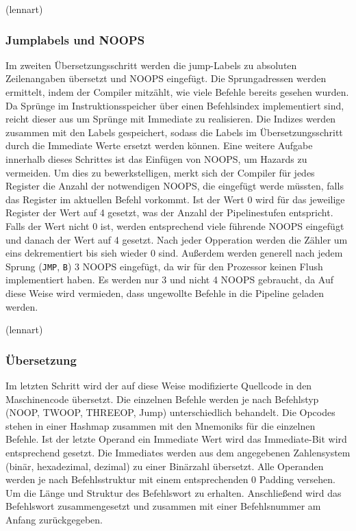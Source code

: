 \documentclass[paper=a4,fontsize=12pt,twocolumn]{scrreprt}
\begin{document}
(lennart)

\subsubsection{Jumplabels und NOOPS}
Im zweiten Übersetzungsschritt werden die jump-Labels zu absoluten Zeilenangaben übersetzt und NOOPS eingefügt.
Die Sprungadressen werden ermittelt, indem der Compiler mitzählt, wie viele Befehle bereits gesehen wurden.
Da Sprünge im Instruktionsspeicher über einen Befehlsindex implementiert sind, reicht dieser aus um Sprünge mit Immediate zu realisieren.
Die Indizes werden zusammen mit den Labels gespeichert, sodass die Labels im Übersetzungsschritt durch die Immediate Werte ersetzt werden können.
Eine weitere Aufgabe innerhalb dieses Schrittes ist das Einfügen von NOOPS, um Hazards zu vermeiden.
Um dies zu bewerkstelligen, merkt sich der Compiler für jedes Register die Anzahl der notwendigen NOOPS, die eingefügt werde müssten, falls das Register im aktuellen Befehl vorkommt.
Ist der Wert 0 wird für das jeweilige Register der Wert auf 4 gesetzt, was der Anzahl der Pipelinestufen entspricht.
Falls der Wert nicht 0 ist, werden entsprechend viele führende NOOPS eingefügt und danach der Wert auf 4 gesetzt. 
Nach jeder Opperation werden die Zähler um eins dekrementiert bis sieh wieder 0 sind.
Außerdem werden generell nach jedem Sprung (\texttt{JMP}, \texttt{B}) 3 NOOPS eingefügt, da wir für den Prozessor keinen Flush implementiert haben. Es werden nur 3 und nicht 4 NOOPS gebraucht, da 
Auf diese Weise wird vermieden, dass ungewollte Befehle in die Pipeline geladen werden.

(lennart)

\subsubsection{Übersetzung}
Im letzten Schritt wird der auf diese Weise modifizierte Quellcode in den Maschinencode übersetzt.
Die einzelnen Befehle werden je nach Befehlstyp (NOOP, TWOOP, THREEOP, Jump) unterschiedlich behandelt.
Die Opcodes stehen in einer Hashmap zusammen mit den Mnemoniks für die einzelnen Befehle.
Ist der letzte Operand ein Immediate Wert wird das Immediate-Bit wird entsprechend gesetzt.
Die Immediates werden aus dem angegebenen Zahlensystem (binär, hexadezimal, dezimal) zu einer Binärzahl übersetzt.
Alle Operanden werden je nach Befehlsstruktur mit einem entsprechenden 0 Padding versehen. Um die Länge und Struktur des Befehlswort zu erhalten.
Anschließend wird das Befehlswort zusammengesetzt und zusammen mit einer Befehlsnummer am Anfang zurückgegeben.
\end{document}
